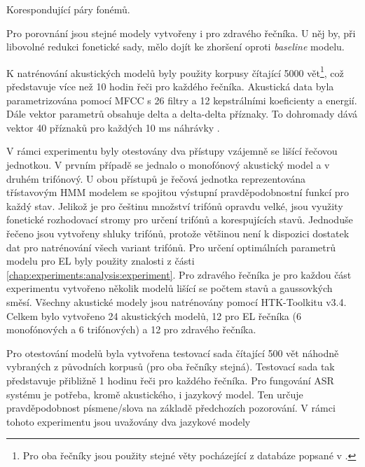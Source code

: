 \begin{table}[htpb]
  \centering
  \def\arraystretch{1.5}
  \caption{Korespondující páry fonémů.}
  \label{tab:experiments:analysis:reduction:pairs}
\end{table}

\noindent Pro porovnání jsou stejné modely vytvořeny i pro zdravého řečníka. U něj by, při libovolné redukci fonetické sady, mělo dojít ke zhoršení oproti \textit{baseline} modelu.

K natrénování akustických modelů byly použity korpusy čítající 5000 vět\footnote{Pro oba řečníky jsou použity stejné věty pocházející z databáze popsané v \cite{Radova2000}.}, což představuje více než 10 hodin řeči pro každého řečníka. Akustická data byla parametrizována pomocí MFCC s 26 filtry a 12 kepstrálními koeficienty a energií. Dále vektor parametrů obsahuje delta a delta-delta příznaky. To dohromady dává vektor 40 příznaků pro každých 10 ms náhrávky \cite{Psutka2007}.

V rámci experimentu byly otestovány dva přístupy vzájemně se lišící řečovou jednotkou. V prvním případě se jednalo o monofónový akustický model a v druhém trifónový. U obou přístupů je řečová jednotka reprezentována třístavovým HMM modelem se spojitou výstupní pravděpodobnostní funkcí pro každý stav. Jelikož je pro češtinu množství trifónů opravdu velké, jsou využity fonetické rozhodovací stromy pro určení trifónů a korespujících stavů. Jednoduše řečeno jsou vytvořeny shluky trifónů, protože většinou není k dispozici dostatek dat pro natrénování všech variant trifónů. Pro určení optimálních parametrů modelu pro EL byly použity znalosti z části \ref{chap:experiments:analysis:experiment}. Pro zdravého řečníka je pro každou část experimentu vytvořeno několik modelů lišící se počtem stavů a gaussovkých směsí. Všechny akustické modely jsou natrénovány pomocí HTK-Toolkitu v3.4. Celkem bylo vytvořeno 24 akustických modelů, 12 pro EL řečníka (6 monofónových a 6 trifónových) a 12 pro zdravého řečníka.

Pro otestování modelů byla vytvořena testovací sada čítající 500 vět náhodně vybraných z původních korpusů (pro oba řečníky stejná). Testovací sada tak představuje přibližně 1 hodinu řeči pro každého řečníka. Pro fungování ASR systému je potřeba, kromě akustického, i jazykový model. Ten určuje pravděpodobnost písmene/slova na základě předchozích pozorování. V rámci tohoto experimentu jsou uvažovány dva jazykové modely

